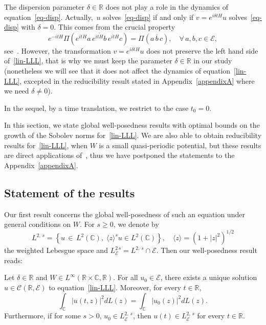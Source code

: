 \documentclass[AHL,Unicode,published]{cedram}
\newcommand{\C}{\mathbb{C}}
\newcommand{\R}{\mathbb{R}}
\newcommand{\E}{\mathcal{E}}
\newcommand{\clC}{\mathcal{C}}
\newcommand{\ov}{\overline}
\newcommand{\<}{\langle}
\renewcommand{\>}{\rangle}
\let\oldforall\forall
\renewcommand*{\forall}{\mathrel{\oldforall}}
\newcommand{\R}{\mathbb{R}}
\begin{document}
The dispersion parameter $\delta \in \R$ does not play a role in the dynamics of equation~\eqref{eq-disp}. Actually,~$u$ solves~\eqref{eq-disp} if and only if $v=e^{i \delta t H}u$ solves~\eqref{eq-disp} with $\delta=0$. This comes from the crucial property
\[
e^{-itH}\Pi\left(e^{itH} a\, \ov{e^{itH} b}\, e^{itH} c\right)= \Pi\left(a\, \ov{b}\, c\right), \quad \forall \,a,b,c \in \E,
\]
see~\cite[Lemma~2.4 and Corollary~2.5]{GHT1}. However, the transformation $v=e^{i \delta t H}u$ does not preserve the left hand side of~\eqref{lin-LLL}, that is why we must keep the parameter $\delta \in \R$ in our study (nonetheless we will see that it does not affect the dynamics of equation~\eqref{lin-LLL}, excepted in the reducibility result stated in Appendix~\ref{appendixA} where we need $\delta \neq 0$).

In the sequel, by a time translation, we restrict to the case $t_0=0$.

In this section, we state global well-posedness results with optimal bounds on the growth of the Sobolev norms for~\eqref{lin-LLL}. We are also able to obtain reducibility results for~\eqref{lin-LLL}, when $W$ is a small quasi-periodic potential, but these results are direct applications of~\cite{Grebert-Thomann}, thus we have postponed the statements to the Appendix~\ref{appendixA}.

\subsection{Statement of the results}
Our first result concerns the global well-posedness of such an equation under general conditions on $W$. For $s\geq 0$, we denote by
\begin{equation}\label{defl2}
L^{2,\,s}=\left\{u\,\in\,L^2(\C), \;\<z\>^su \in L^2(\C)\right\}, \quad \<z\>=\left(1+|z|^2\right)^{1/2}
\end{equation}
the weighted Lebesgue space and $L^{2\,s}_{\E}=L^{2,\,s} \cap \E$. Then our well-posedness result reads:

\begin{theo}\label{thm2.1}
Let $\delta \in \R$ and $W\in L^{\infty}(\R\times \C,\R)$. For all $u_0 \in \E$, there exists a unique solution $u\in \clC (\R,
\E)$ to equation~\eqref{lin-LLL}. Moreover, for every $t\in \R$,
\[
\int_{\C}\left|u(t,z)\right|^2dL(z)=\int_{\C}\left|u_0(z)\right|^2dL(z).
\]
Furthermore, if for some $s>0$, $u_0 \in L^{2,\,s}_\E$, then $u(t) \in L^{2,\,s}_\E$ for every $t\in \R$.
\end{theo}
\end{document}
